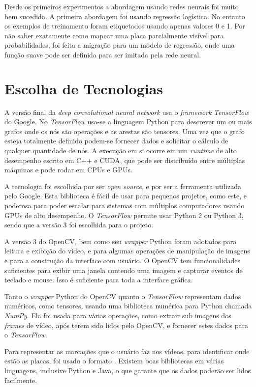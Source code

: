 Desde os primeiros experimentos a abordagem usando redes neurais foi muito bem
sucedida. A primeira abordagem foi usando regressão logística. No entanto os
exemplos de treinamento foram etiquetados usando apenas valores 0 e 1. Por
não saber exatamente como mapear uma placa parcialmente visível para
probabilidades, foi feita a migração para um modelo de regressão, onde uma
função suave pode ser definida para ser imitada pela rede neural.

\section{Escolha de Tecnologias} \label{sec:cap5_tecnol}
A versão final da \emph{deep convolutional neural network} usa o
\emph{framework} \emph{TensorFlow} do Google.
No \emph{TensorFlow} usa-se a linguagem Python para descrever um ou mais
grafos onde
os nós são operações e as arestas são tensores. Uma vez que o grafo esteja
totalmente definido podem-se fornecer dados e solicitar o cálculo de qualquer
quantidade de nós. A execução em si ocorre em um \emph{runtime} de alto
desempenho escrito em C++ e CUDA, que pode ser distribuído entre múltiplas
máquinas e pode rodar em CPUs e GPUs.

A tecnologia foi escolhida por ser \emph{open source}, e por ser a ferramenta
utilizada pelo Google. Esta biblioteca é fácil de usar para pequenos projetos,
como este, e poderosa para poder escalar para sistemas com múltiplos
computadores usando GPUs de alto desempenho. O \emph{TensorFlow} permite usar
Python 2 ou Python 3, sendo que a versão 3 foi escolhida para o projeto.

A versão 3 do OpenCV, bem como seu \emph{wrapper} Python foram adotados para
leitura e exibição do vídeo, e para algumas operações de manipulação de
imagens e para a construção da interface com usuário. O OpenCV tem
funcionalidades suficientes para exibir uma janela contendo
uma imagem e capturar eventos de teclado e mouse. Isso é suficiente para toda a
interface gráfica.

Tanto o \emph{wrapper} Python do OpenCV quanto o \emph{TensorFlow} representam
dados numéricos, como tensores, usando uma biblioteca numérica para
Python chamada \emph{NumPy}. Ela foi usada para várias operações, como
extrair sub imagens
dos \emph{frames} de vídeo, após terem sido lidos pelo OpenCV, e fornecer
estes dados para o \emph{TensorFlow}.

Para representar as marcações que o usuário faz nos vídeos, para identificar
onde estão as placas, foi usado o formato .
Existem boas
bibliotecas em várias linguagens, inclusive Python e Java, o que garante que os
dados poderão ser lidos facilmente.

